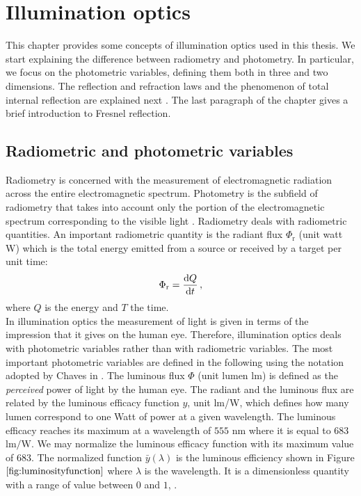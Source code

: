 \chapter{Illumination optics}\label{chap:Illumination optics}
This chapter provides some concepts of illumination optics used in this thesis. We start explaining the difference between radiometry and photometry.
In particular, we focus on the photometric variables, defining them both in three and two dimensions. The reflection and refraction laws and the phenomenon of total internal reflection are explained next . The last paragraph of the chapter gives a brief introduction to Fresnel reflection. 
\section{Radiometric and photometric variables}\label{sec:photometry}
Radiometry is concerned with the measurement of electromagnetic radiation across the entire electromagnetic spectrum. Photometry is the subfield of radiometry that takes into account only the portion of the electromagnetic spectrum corresponding to the visible light \cite{zalewski1995radiometry}. Radiometry deals with radiometric quantities. An important radiometric quantity  is the radiant flux $\Phi_{\textrm{r}}$ (unit watt \textrm{W}) which is the total energy emitted from a source or received by a target per unit time:
\begin{equation}
\Phi_{\textrm{r}} = \frac{\textrm{d}Q}{\textrm{d}t}\,,
\end{equation}
where $Q$ is the energy and $T$ the time.\\
\indent In illumination optics the measurement of light is given in terms of the impression that it gives on the human eye. Therefore, illumination optics deals with photometric variables rather than with radiometric variables. The most important photometric variables are defined in the following using the notation adopted by Chaves in \cite{chaves2015introduction}. The luminous flux $\Phi$ (unit lumen \textrm{lm}) is defined as the \textit{perceived} power of light by the human eye.
 The radiant and the luminous flux are related by the luminous efficacy function $y$, unit \textrm{lm}/\textrm{W}, which defines how many lumen correspond to one Watt of power at a given wavelength.
 The luminous efficacy reaches its maximum  at a wavelength of $555$ $\textrm{nm}$ where it is equal to $683$ $\textrm{lm}/\textrm{W}$.
  We may normalize the luminous efficacy function with its maximum value of $683$.
  The normalized function $\bar{y}(\lambda)$ is the luminous efficiency shown in Figure $\ref{fig:luminosityfunction}$ where $\lambda$ is the wavelength. It is a dimensionless quantity with a range of value between $0$ and $1$, \cite{koshel2012illumination}.
